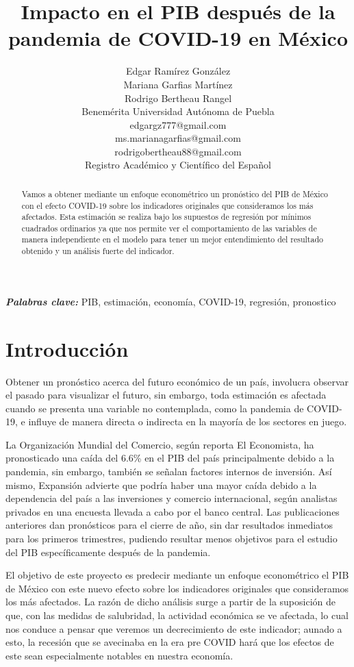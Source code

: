 \documentclass[a4paper]{article}
\title{Impacto en el PIB después de la pandemia de COVID-19 en México}
\author{Edgar Ramírez González\\ Mariana Garfias Martínez\\ Rodrigo Bertheau Rangel\\
  \small Benemérita Universidad Autónoma de Puebla\\
  \small edgargz777@gmail.com\\
  \small ms.marianagarfias@gmail.com\\
  \small rodrigobertheau88@gmail.com\\
  \small Registro Académico y Científico del Español
  \date{}
}
\begin{document}
\maketitle

\begin{abstract}
Vamos a obtener mediante un enfoque econométrico un pronóstico del PIB de México con el efecto COVID-19 sobre los indicadores originales que consideramos los más afectados. Esta estimación se realiza bajo los supuestos de regresión por mínimos cuadrados ordinarios ya que nos permite ver el comportamiento de las variables de manera independiente en el modelo para tener un mejor entendimiento del resultado obtenido y un análisis fuerte del indicador.  
\end{abstract}

\providecommand{\keywords}[1]
{
  \small	
  \textbf{\textit{Palabras clave: }} #1
}
\keywords{PIB, estimación, economía, COVID-19, regresión, pronostico}

\section{Introducci\'on}

Obtener un pronóstico acerca del futuro económico de un país, involucra observar el pasado para visualizar el futuro, sin embargo, toda estimación es afectada cuando se presenta una variable no contemplada, como la pandemia de COVID-19, e influye de manera directa o indirecta en la mayoría de los sectores en juego.

La Organización Mundial del Comercio, según reporta El Economista, ha pronosticado una caída del 6.6\% en el PIB del país principalmente debido a la pandemia, sin embargo, también se señalan factores internos de inversión. Así mismo, Expansión advierte que podría haber una mayor caída debido a la dependencia del país a las inversiones y comercio internacional, según analistas privados en una encuesta llevada a cabo por el banco central. Las publicaciones anteriores dan pronósticos para el cierre de año, sin dar resultados inmediatos para los primeros trimestres, pudiendo resultar menos objetivos para el estudio del PIB específicamente después de la pandemia.

El objetivo de este proyecto es predecir mediante un enfoque econométrico el PIB de México con este nuevo efecto sobre los indicadores originales que consideramos los más afectados. La razón de dicho análisis surge a partir de la suposición de que, con las medidas de salubridad, la actividad económica se ve afectada, lo cual nos conduce a pensar que veremos un decrecimiento de este indicador; aunado a esto, la recesión que se avecinaba en la era pre COVID hará que los efectos de este sean especialmente notables en nuestra economía.
\end{document}
